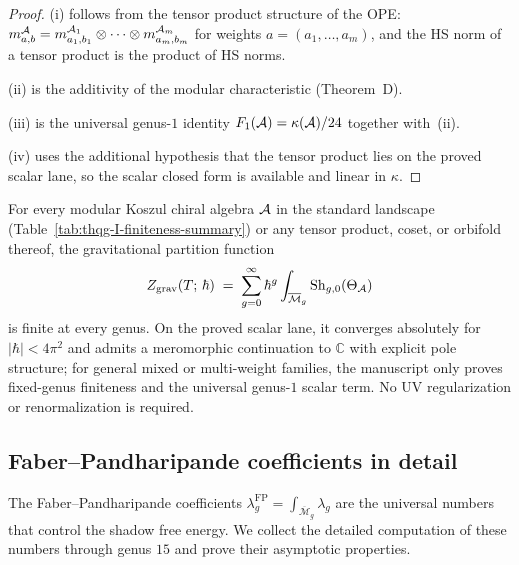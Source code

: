 \begin{proof}
(i) follows from the tensor product structure of the OPE: $m^{\mathcal{A}}_{a,b} = m^{\mathcal{A}_1}_{a_1,b_1} \otimes \cdots \otimes m^{\mathcal{A}_m}_{a_m,b_m}$ for weights $a = (a_1,\ldots,a_m)$, and the HS norm of a tensor product is the product of HS norms.

(ii) is the additivity of the modular characteristic (Theorem~D).

(iii) is the universal genus-$1$ identity
$F_1(\mathcal{A})=\kappa(\mathcal{A})/24$ together with~(ii).

(iv) uses the additional hypothesis that the tensor product lies on the
proved scalar lane, so the scalar closed form is available and linear in
$\kappa$.
\end{proof}

\begin{remark}
\label{rem:thqg-I-complete-finiteness}
For every modular Koszul chiral algebra $\mathcal{A}$ in the standard landscape \textup{(}Table~\textup{\ref{tab:thqg-I-finiteness-summary})} or any tensor product, coset, or orbifold thereof, the gravitational partition function
\[
Z_{\mathrm{grav}}(T;\,\hbar) \;=\; \sum_{g=0}^\infty \hbar^g \int_{\overline{\mathcal{M}}_g} \operatorname{Sh}_{g,0}(\Theta_{\mathcal{A}})
\]
is finite at every genus. On the proved scalar lane, it converges
absolutely for $|\hbar| < 4\pi^2$ and admits a meromorphic continuation
to $\mathbb{C}$ with explicit pole structure; for general mixed or
multi-weight families, the manuscript only proves fixed-genus finiteness
and the universal genus-$1$ scalar term. No UV regularization or
renormalization is required.
\end{remark}



\subsection{Faber--Pandharipande coefficients in detail}
\label{subsec:thqg-I-fp-coefficients}

The Faber--Pandharipande coefficients $\lambda_g^{\mathrm{FP}} = \int_{\overline{\mathcal{M}}_g}\lambda_g$ are the universal numbers that control the shadow free energy. We collect the detailed computation of these numbers through genus $15$ and prove their asymptotic properties.

